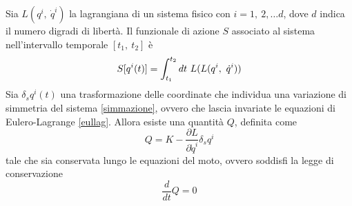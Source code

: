 \begin{theorem}
    Sia $L(q^i,~\dot q^i)$ la lagrangiana di un sistema fisico con $i=1,~2,\ldots d$, dove $d$ indica il numero digradi di libertà. Il funzionale di azione $S$ associato al sistema nell'intervallo temporale $[t_1,~t_2]$ è
\begin{equation*}
    S[q^i(t)] = \int_{t_1}^{t_2}dt~ L(L(q^i,~\dot q^i))
\end{equation*}
    Sia $\delta_s q^i(t)$ una trasformazione delle coordinate che individua una variazione di simmetria del sistema \eqref{simmazione}, ovvero che lascia invariate le equazioni di Eulero-Lagrange \eqref{eullag}. Allora esiste una quantità $Q$, definita come
\begin{equation}\label{carica}
    Q = K - \frac{\partial L}{\partial \dot q^i} \delta_s q^i
\end{equation}
    tale che sia conservata lungo le equazioni del moto, ovvero soddisfi la legge di conservazione
\begin{equation} \label{th}
    \frac{d}{dt} Q = 0
\end{equation}
\end{theorem}

